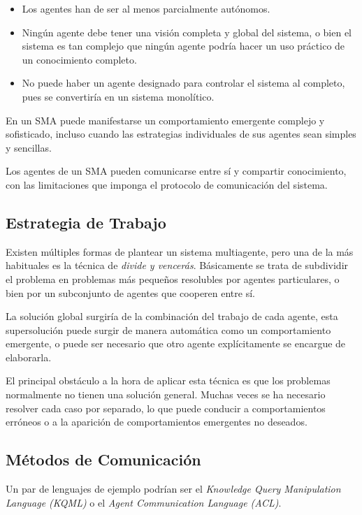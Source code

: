 \begin{itemize}
 \item Los agentes han de ser al menos parcialmente autónomos.
 \item Ningún agente debe tener una visión completa y global del sistema, o
 bien el sistema es tan complejo que ningún agente podría hacer un uso práctico
 de un conocimiento completo.
 \item No puede haber un agente designado para controlar el sistema al
 completo, pues se convertiría en un sistema monolítico.
\end{itemize}

En un SMA puede manifestarse un comportamiento emergente complejo y sofisticado,
incluso cuando las estrategias individuales de sus agentes sean simples y
sencillas.

Los agentes de un SMA pueden comunicarse entre sí y compartir conocimiento, con
las limitaciones que imponga el protocolo de comunicación del sistema.

\subsection*{Estrategia de Trabajo}

Existen múltiples formas de plantear un sistema multiagente, pero una de la más
habituales es la técnica de {\em divide y vencerás}. Básicamente se trata de
subdividir el problema en problemas más pequeños resolubles por agentes
particulares, o bien por un subconjunto de agentes que cooperen entre sí.

La solución global surgiría de la combinación del trabajo de cada agente, esta
supersolución puede surgir de manera automática como un comportamiento
emergente, o puede ser necesario que otro agente explícitamente se encargue de
elaborarla.

El principal obstáculo a la hora de aplicar esta técnica es que los problemas
normalmente no tienen una solución general. Muchas veces se ha necesario
resolver cada caso por separado, lo que puede conducir a comportamientos
erróneos o a la aparición de comportamientos emergentes no deseados.

\subsection*{Métodos de Comunicación}

Un par de lenguajes de ejemplo podrían ser el {\em Knowledge Query Manipulation
Language (KQML)} o el {\em Agent Communication Language (ACL)}.


